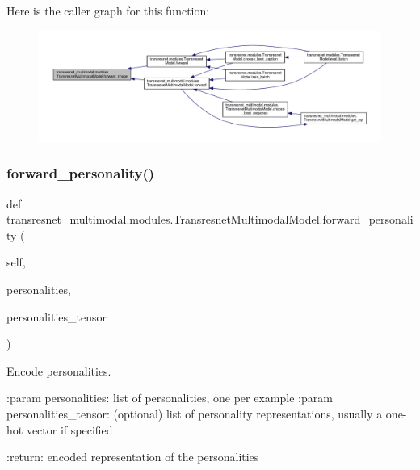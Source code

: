 Here is the caller graph for this function\+:
\nopagebreak
\begin{figure}[H]
\begin{center}
\leavevmode
\includegraphics[width=350pt]{classtransresnet__multimodal_1_1modules_1_1TransresnetMultimodalModel_aec98b66974021d37e0e256be86aa16f2_icgraph}
\end{center}
\end{figure}
\mbox{\label{classtransresnet__multimodal_1_1modules_1_1TransresnetMultimodalModel_a50a29d40246542bad1cf6fc380d66327}} 
\subsubsection{\texorpdfstring{forward\+\_\+personality()}{forward\_personality()}}
{\footnotesize\ttfamily def transresnet\+\_\+multimodal.\+modules.\+Transresnet\+Multimodal\+Model.\+forward\+\_\+personality (\begin{DoxyParamCaption}\item[{}]{self,  }\item[{}]{personalities,  }\item[{}]{personalities\+\_\+tensor }\end{DoxyParamCaption})}

\begin{DoxyVerb}Encode personalities.

:param personalities:
    list of personalities, one per example
:param personalities_tensor:
    (optional) list of personality representations, usually a one-hot
    vector if specified

:return:
    encoded representation of the personalities
\end{DoxyVerb}
 

